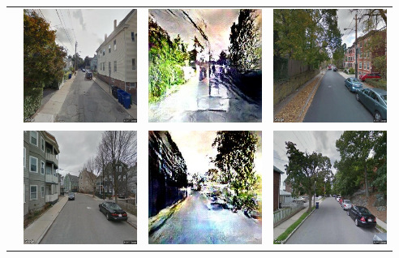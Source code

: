 \begin{table}
\begin{tabular}{l*3{C}@{}}
        & \includegraphics[width=10em]{u_4.jpeg} & \includegraphics[width=10em]{t_4.jpeg} &  \includegraphics[width=10em]{b_4.jpeg} \\ 
        & \includegraphics[width=10em]{u_5.jpeg} & \includegraphics[width=10em]{t_5.jpeg} &  \includegraphics[width=10em]{b_5.jpeg} \\ 

\end{tabular}
\end{table}
